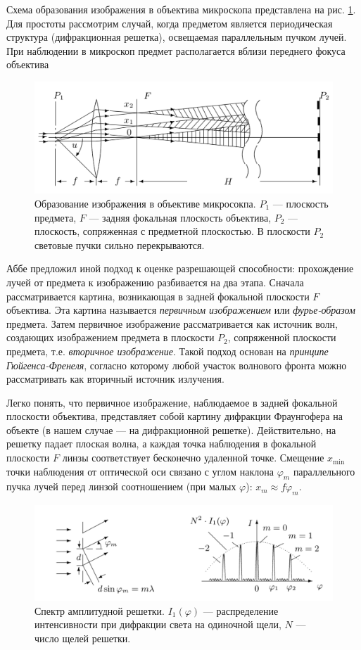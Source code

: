 \documentclass[a4paper, 12pt]{article}
\begin{document}
	Схема образования изображения в объектива микроскопа представлена на рис. \ref{fig:2}. Для простоты рассмотрим случай, когда предметом является периодическая структура (дифракционная решетка), освещаемая параллельным пучком лучей. При наблюдении в микроскоп предмет располагается вблизи переднего фокуса объектива\par
	\begin{figure}
		\includegraphics[scale=0.4]{fig2.png}
		\caption{Образование изображения в объективе микросокпа. $P_1$ — плоскость предмета, $F$ — задняя фокальная плоскость объектива, $P_2$ — плоскость, сопряженная с предметной плоскостью. В плоскости $P_2$ световые пучки сильно перекрываются.}
		\label{fig:2}
	\end{figure}
	Аббе предложил иной подход к оценке разрешающей способности: прохождение лучей от предмета к изображению разбивается на два этапа. Сначала рассматривается картина, возникающая в задней фокальной плоскости $F$ объектива. Эта картина называется \textit{первичным изображением} или \textit{фурье-образом} предмета. Затем первичное изображение рассматривается как источник волн, создающих изображением предмета в плоскости $P_2$, сопряженной плоскости предмета, т.е. \textit{вторичное изображение}. Такой подход основан на \textit{принципе Гюйгенса-Френеля}, согласно которому любой участок волнового фронта можно рассматривать как вторичный источник излучения.\par
	Легко понять, что первичное изображение, наблюдаемое в задней фокальной плоскости объектива, представляет собой картину дифракции Фраунгофера на объекте (в нашем случае — на дифракционной решетке). Действительно, на решетку падает плоская волна, а каждая точка наблюдения в фокальной плоскости $F$ линзы соответствует бесконечно удаленной точке. Смещение $x_{\min}$ точки наблюдения от оптической оси связано с углом наклона $\varphi_m$ параллельного пучка лучей перед линзой соотношением (при малых $\varphi$): $x_m\approx f\varphi_m$.\par
	\begin{figure}
		\includegraphics[scale=0.4]{fig3.png}
		\caption{Спектр амплитудной решетки. $I_1\left(\varphi\right)$ — распределение интенсивности при дифракции света на одиночной щели, $N$ — число щелей решетки.}
		\label{fig:3}
	\end{figure}
\end{document}
